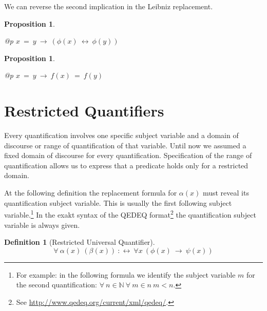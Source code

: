\documentclass[a4paper,german,10pt,twoside]{book}
\newtheorem{prop}[thm]{Proposition}
\theoremstyle{definition}
\newtheorem{defn}[thm]{Definition}
\theoremstyle{remark}
\begin{document}
\par
We can reverse the second implication in the Leibniz replacement.

\begin{prop}
\label{theorem:leibnizEquivalence} \hypertarget{theorem:leibnizEquivalence}{}
\mbox{}
\begin{longtable}{{@{\extracolsep{\fill}}p{\linewidth}}}
\centering $x \ =  \ y\ \rightarrow \ (\phi(x)\ \leftrightarrow \ \phi(y))$
\end{longtable}

\end{prop}




\par


\begin{prop}
\label{theorem:identyImpliesFunctionalEquality} \hypertarget{theorem:identyImpliesFunctionalEquality}{}
\mbox{}
\begin{longtable}{{@{\extracolsep{\fill}}p{\linewidth}}}
\centering $x \ =  \ y\ \rightarrow \ f(x) \ =  \ f(y)$
\end{longtable}

\end{prop}




\section{Restricted Quantifiers} \label{chapter6_section1} \hypertarget{chapter6_section1}{}
Every quantification involves one specific subject variable and a domain of discourse or range of quantification of that variable. Until now we assumed a fixed domain of discourse for every quantification. Specification of the range of quantification allows us to express that a predicate holds only for a restricted domain.

\par
At the following definition the replacement formula for $\alpha(x)$ must {\glqq reveal\grqq} its quantification subject variable. This is usually the first following subject variable.\footnote{For example: in the following formula we identify the subject variable $m$ for the second quantification: $\forall \ n \in \mathbb{N} \ \forall \ m \in n \ m < n $.} In the exakt syntax of the QEDEQ format\footnote{See \url{http://www.qedeq.org/current/xml/qedeq/}.} the quantification subject variable is always given.

\begin{defn}[Restricted Universal Quantifier]
\label{definition:restrictedUniversalQuantifier} \hypertarget{definition:restrictedUniversalQuantifier}{}
$$\forall \ \alpha(x) \ (\beta(x))\ :\leftrightarrow \ \forall x\ (\phi(x)\ \rightarrow \ \psi(x))$$

\end{defn}
\end{document}
